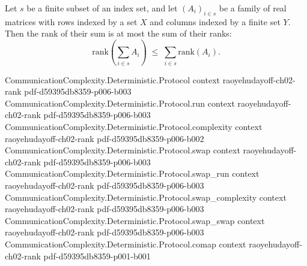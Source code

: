 \begin{theorem}
\label{Matrix.rank_sum_le}
\leanok
{}
Let $s$ be a finite subset of an index set, and let $(A_i)_{i \in s}$ be a family of
real matrices with rows indexed by a set $X$ and columns indexed by a finite set $Y$.
Then the rank of their sum is at most the sum of their ranks:
\[
\mathrm{rank}\!\left(\sum_{i \in s} A_i\right) \;\le\; \sum_{i \in s}
\mathrm{rank}(A_i).
\]
\end{theorem}

\begin{theorem}
\label{CommunicationComplexity.Deterministic.Rank.boolFunctionRank_le_ncard}
\leanok
{}
\proofstep
  {CommunicationComplexity.Deterministic.Protocol}
  {context}
  {raoyehudayoff-ch02-rank}
  {pdf-d59395db8359-p006-b003}
\proofstep
  {CommunicationComplexity.Deterministic.Protocol.run}
  {context}
  {raoyehudayoff-ch02-rank}
  {pdf-d59395db8359-p006-b003}
\proofstep
  {CommunicationComplexity.Deterministic.Protocol.complexity}
  {context}
  {raoyehudayoff-ch02-rank}
  {pdf-d59395db8359-p006-b002}
\proofstep
  {CommunicationComplexity.Deterministic.Protocol.swap}
  {context}
  {raoyehudayoff-ch02-rank}
  {pdf-d59395db8359-p006-b003}
\proofstep
  {CommunicationComplexity.Deterministic.Protocol.swap_run}
  {context}
  {raoyehudayoff-ch02-rank}
  {pdf-d59395db8359-p006-b003}
\proofstep
  {CommunicationComplexity.Deterministic.Protocol.swap_complexity}
  {context}
  {raoyehudayoff-ch02-rank}
  {pdf-d59395db8359-p006-b003}
\proofstep
  {CommunicationComplexity.Deterministic.Protocol.swap_swap}
  {context}
  {raoyehudayoff-ch02-rank}
  {pdf-d59395db8359-p006-b003}
\proofstep
  {CommunicationComplexity.Deterministic.Protocol.comap}
  {context}
  {raoyehudayoff-ch02-rank}
  {pdf-d59395db8359-p001-b001}

\end{theorem}
